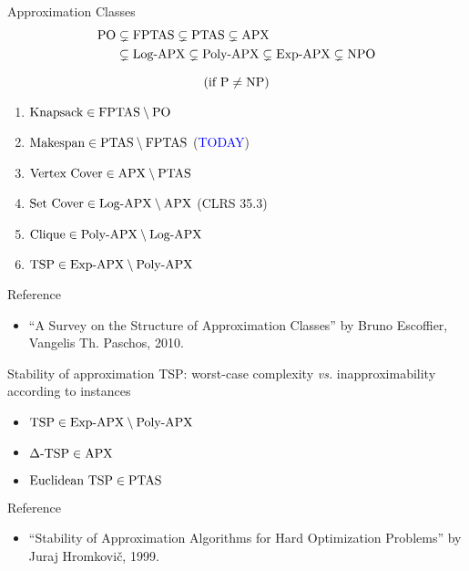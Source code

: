 \begin{frame}{Approximation Classes}
  \begin{align*}
	\text{PO} &\subsetneq \text{FPTAS} \subsetneq \text{PTAS} \subsetneq \text{APX} \\
	&\subsetneq \text{Log-APX} \subsetneq \text{Poly-APX} \subsetneq \text{Exp-APX} \subsetneq \text{NPO}
  \end{align*}

  \vspace{-0.50cm}
  \[
	(\text{if } \text{P}{} \neq \text{NP}{})
  \]

  \begin{enumerate}
	\item $\text{Knapsack} \in \text{FPTAS} \setminus \text{PO}$
	\item $\text{Makespan} \in \text{PTAS} \setminus \text{FPTAS}$ ({\small \textcolor{blue}{TODAY}})
	\item $\text{Vertex Cover} \in \text{APX} \setminus \text{PTAS}$ 
	\item $\text{Set Cover} \in \text{Log-APX} \setminus \text{APX}$ ({\small CLRS 35.3})
	\item $\text{Clique} \in \text{Poly-APX} \setminus \text{Log-APX}$
	\item $\text{TSP} \in \text{Exp-APX} \setminus \text{Poly-APX}$
  \end{enumerate}

  \begin{alertblock}{Reference}
	\begin{itemize}
	  \item ``A Survey on the Structure of Approximation Classes'' by Bruno Escoffier, 	Vangelis Th. Paschos, 2010.
	\end{itemize}
  \end{alertblock}
\end{frame}
\begin{frame}{Stability of approximation}
  TSP: worst-case complexity \emph{vs.} inapproximability according to instances

  \begin{itemize}
	\item $\text{TSP} \in \text{Exp-APX} \setminus \text{Poly-APX}$
	\item $\Delta\text{-TSP} \in \text{APX}{}$
	\item $\text{Euclidean TSP} \in \text{PTAS}{}$
  \end{itemize}

  \begin{alertblock}{Reference}
	\begin{itemize}
	  \item ``Stability of Approximation Algorithms for Hard Optimization Problems'' by Juraj Hromkovi\v{c}, 1999.
	\end{itemize}
  \end{alertblock}
\end{frame}
